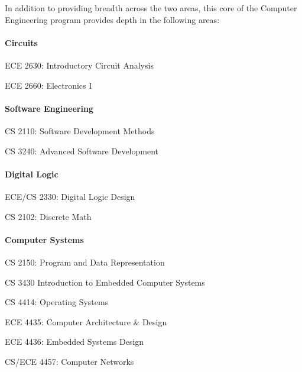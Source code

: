 
\noindent In addition to providing breadth across the two areas,
this core of the Computer Engineering program provides
depth in the following areas:


\paragraph{Circuits}
\begin{itemlist}
\item ECE 2630: Introductory Circuit Analysis
\item ECE 2660: Electronics I
\end{itemlist}

\paragraph{Software Engineering}
\begin{itemlist}
\item CS 2110: Software Development Methods
\item CS 3240: Advanced Software Development
\end{itemlist}

\paragraph{Digital Logic}
\begin{itemlist}
\item ECE/CS 2330: Digital Logic Design
\item CS 2102: Discrete Math
\end{itemlist}

\paragraph{Computer Systems}
\begin{itemlist}
\item CS 2150: Program and Data Representation
\item CS 3430 Introduction to Embedded Computer Systems
\item CS 4414: Operating Systems
\item ECE 4435: Computer Architecture \& Design
\item ECE 4436: Embedded Systems Design
\item CS/ECE 4457: Computer Networks
\end{itemlist}

